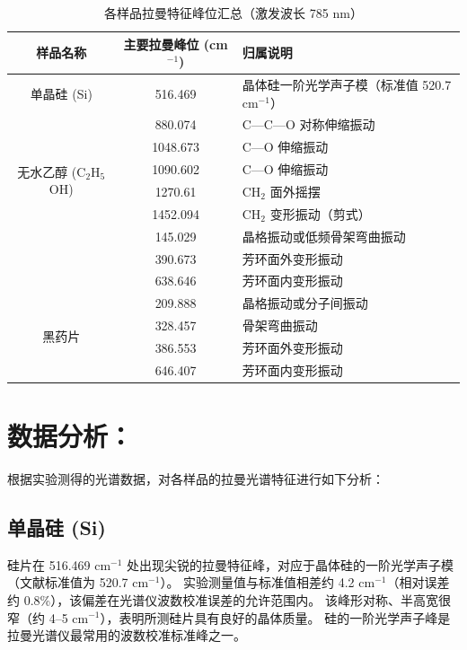 \begin{table}[htbp]
    \centering
    \caption{各样品拉曼特征峰位汇总（激发波长 785 nm）}
    \label{tab:raman-peaks}
    \begin{tabular}{ccl}
        \hline
        \textbf{样品名称} & \textbf{主要拉曼峰位 (cm$^{-1}$)} & \textbf{归属说明} \\
        \hline
        单晶硅 (Si) & 516.469 & 晶体硅一阶光学声子模（标准值 520.7 cm$^{-1}$）\\
        \hline
        \multirow{6}{*}{无水乙醇 (C$_2$H$_5$OH)} 
            & 880.074 & C—C—O 对称伸缩振动 \\
            & 1048.673 & C—O 伸缩振动 \\
            & 1090.602 & C—O 伸缩振动 \\
            & 1270.61 & CH$_2$ 面外摇摆 \\
            & 1452.094 & CH$_2$ 变形振动（剪式） \\
        \hline
        \multirow{5}{*}{白药片} 
            & 145.029 & 晶格振动或低频骨架弯曲振动 \\
            & 390.673 & 芳环面外变形振动 \\
            & 638.646 & 芳环面内变形振动 \\
        \hline
        \multirow{6}{*}{黑药片} 
            & 209.888 & 晶格振动或分子间振动 \\
            & 328.457 & 骨架弯曲振动 \\
            & 386.553 & 芳环面外变形振动 \\
            & 646.407 & 芳环面内变形振动 \\
        \hline
    \end{tabular}
\end{table}

\section{数据分析：}

根据实验测得的光谱数据，对各样品的拉曼光谱特征进行如下分析：

\subsection{单晶硅 (Si)}

硅片在 516.469 cm$^{-1}$ 处出现尖锐的拉曼特征峰，对应于晶体硅的一阶光学声子模（文献标准值为 520.7 cm$^{-1}$）。
实验测量值与标准值相差约 4.2 cm$^{-1}$（相对误差约 0.8\%），该偏差在光谱仪波数校准误差的允许范围内。
该峰形对称、半高宽很窄（约 4--5 cm$^{-1}$），表明所测硅片具有良好的晶体质量。
硅的一阶光学声子峰是拉曼光谱仪最常用的波数校准标准峰之一。

